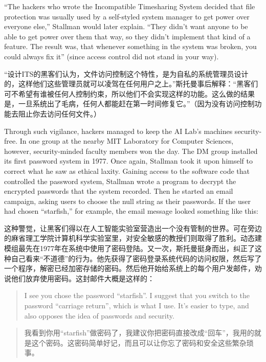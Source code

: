 \ifdefined\eng
``The hackers who wrote the Incompatible Timesharing System decided that file protection was usually used by a self-styled system manager to get power over everyone else,'' Stallman would later explain. ``They didn't want anyone to be able to get power over them that way, so they didn't implement that kind of a feature. The result was, that whenever something in the system was broken, you could always fix it'' (since access control did not stand in your way).
\fi

\ifdefined\chs
``设计ITS的黑客们认为，文件访问控制这个特性，是为自私的系统管理员设计的，这样他们这些管理员就可以凌驾在任何用户之上。''斯托曼事后解释：``黑客们可不希望有谁被任何人控制约束，所以他们不会实现这样的功能。这么做的结果是，一旦系统出了毛病，任何人都能赶在第一时间修复它。''（因为没有访问控制功能去阻止你去访问任何文件。）
\fi

\ifdefined\eng
Through such vigilance, hackers managed to keep the AI Lab's machines security-free. In one group at the nearby MIT Laboratory for Computer Sciences, however, security-minded faculty members won the day. The DM group installed its first password system in 1977. Once again, Stallman took it upon himself to correct what he saw as ethical laxity. Gaining access to the software code that controlled the password system, Stallman wrote a program to decrypt the encrypted passwords that the system recorded.  Then he started an email campaign, asking users to choose the null string as their passwords. If the user had chosen ``starfish,'' for example, the email message looked something like this:
\fi

\ifdefined\chs
这种警觉，让黑客们得以在人工智能实验室营造出一个没有管制的世界。可在旁边的麻省理工学院计算机科学实验室里，对安全敏感的教授们则取得了胜利。动态建模组最先在1977年在系统中使用了密码登陆。又一次，斯托曼挺身而出，纠正了这种自己看来``不道德''的行为。他先获得了密码登录系统代码的访问权限，然后写了一个程序，解密已经加密存储的密码。然后他开始给系统上的每个用户发邮件，劝说他们放弃使用密码。这封邮件大概是这样的：
\fi

\ifdefined\eng
\begin{quote}
I see you chose the password ``starfish''. I suggest that you switch to the password ``carriage return'', which is what I use. It's easier to type, and also opposes the idea of passwords and security.
\end{quote}
\fi

\ifdefined\chs
\begin{quote}
我看到你用``starfish''做密码了，我建议你把密码直接改成``回车''，我用的就是这个密码。这密码简单好记，而且可以让你忘了密码和安全这些繁杂琐事。
\end{quote}
\fi

